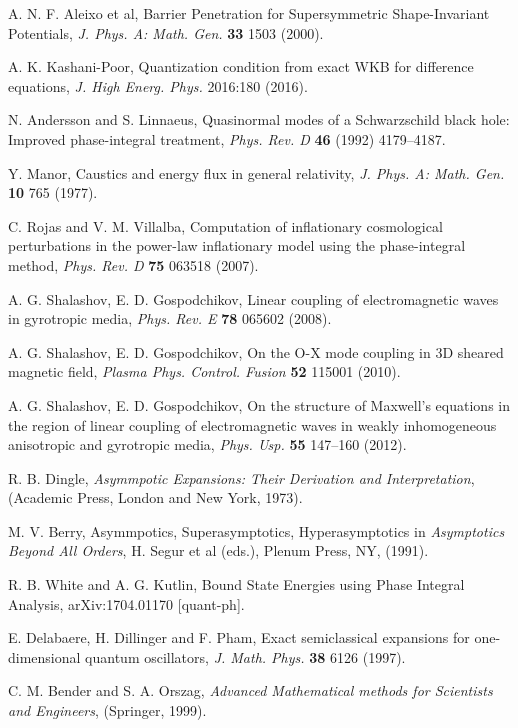 \documentclass{ws-m3as}
\begin{document}
\begin{thebibliography}{30}
 A. N. F. Aleixo et al, 
Barrier Penetration for Supersymmetric Shape-Invariant Potentials,
\textit{J. Phys. A: Math. Gen.} \textbf{33} 1503 (2000).

 A. K. Kashani-Poor, 
Quantization condition from exact WKB for difference equations,
\textit{J. High Energ. Phys.} 2016:180 (2016).

 N. Andersson and S. Linnaeus, 
Quasinormal modes of a Schwarzschild black hole: Improved phase-integral treatment,
\textit{Phys. Rev. D} \textbf{46} (1992) 4179--4187.

 Y. Manor, 
Caustics and energy flux in general relativity,
\textit{J. Phys. A: Math. Gen.} \textbf{10} 765 (1977).

 C. Rojas and V. M. Villalba, 
Computation of inflationary cosmological perturbations in the power-law inflationary model using the phase-integral method,
\textit{Phys. Rev. D} \textbf{75} 063518 (2007).

 A. G. Shalashov,  E. D. Gospodchikov,
Linear coupling of electromagnetic waves in gyrotropic media, 
\textit{Phys. Rev. E} \textbf{78} 065602 (2008).

 A. G. Shalashov, E. D. Gospodchikov, 
On the O-X mode coupling in 3D sheared magnetic field,
\textit{Plasma Phys. Control. Fusion} \textbf{52} 115001 (2010). 

 A. G. Shalashov, E. D. Gospodchikov, 
On the structure of Maxwell's equations in the region of 
linear coupling of electromagnetic waves in weakly
inhomogeneous anisotropic and gyrotropic media,
\textit{Phys. Usp.} \textbf{55} 147--160 (2012).

 R. B. Dingle, 
\textit{Asymmpotic Expansions: Their Derivation and Interpretation}, 
(Academic Press, London and New York, 1973).

 M. V. Berry, 
Asymmpotics, Superasymptotics, Hyperasymptotics in 
\textit{Asymptotics Beyond All Orders}, 
H. Segur et al (eds.), Plenum Press, NY, (1991).

 R. B. White and A. G. Kutlin, 	
Bound State Energies using Phase Integral Analysis,
arXiv:1704.01170 [quant-ph].

 E. Delabaere, H. Dillinger and F. Pham, 
Exact semiclassical expansions for one-dimensional quantum oscillators,
\textit{J. Math. Phys.} \textbf{38} 6126 (1997).

 C. M. Bender and S. A. Orszag, 
\textit{Advanced Mathematical methods for Scientists and Engineers}, 
(Springer, 1999).


\end{thebibliography}
\end{document}
